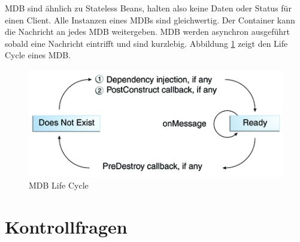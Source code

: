 MDB sind ähnlich zu Stateless Beans, halten also keine Daten oder Status für einen Client. Alle Instanzen eines MDBs sind gleichwertig. Der Container kann die Nachricht an jedes MDB weitergeben. MDB werden asynchron ausgeführt sobald eine Nachricht eintrifft und sind kurzlebig. Abbildung \ref{fig:mdb-lifecycle} zeigt den Life Cycle eines MDB.

\begin{figure}
\centering
\includegraphics[width=0.7\linewidth]{fig/mdb-lifecycle}
\caption{MDB Life Cycle}
\label{fig:mdb-lifecycle}
\end{figure}


\section{Kontrollfragen}